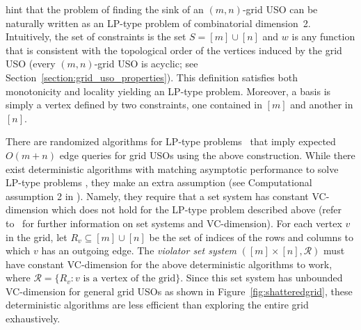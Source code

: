 \documentclass[runningheads,a4paper]{llncs}
\begin{document}
\citet{grid08} hint that the problem of finding the sink of an $(m,n)$-grid USO can be naturally written as an LP-type problem of combinatorial dimension~2. 
Intuitively, the set of constraints is the set $S = [m] \cup [n]$ and $w$ is any function that is consistent with the topological order of the vertices induced by the grid USO (every $(m, n)$-grid USO is acyclic; see Section~\ref{section:grid_uso_properties}). This definition satisfies both monotonicity and locality yielding an LP-type problem.
Moreover, a basis is simply a vertex defined by two constraints, one contained in $[m]$ and another in $[n]$. 

There are randomized algorithms for LP-type problems~\cite{MatousekSW96} that imply expected $O(m+n)$ edge queries for grid USOs using the above construction. 
While there exist deterministic algorithms with matching asymptotic performance to solve LP-type problems \cite{chan16,ChazelleM96}, they make an extra assumption  
(see Computational assumption 2 in \cite{ChazelleM96}). 
Namely, they require that a set system has constant VC-dimension which does not hold for the LP-type problem described above (refer to~\cite{matouvsek2002lectures} for further information on set systems and VC-dimension). 
For each vertex $v$ in the grid, let $R_v\subseteq [m]\cup [n]$ be the set of indices of the rows and columns to which $v$ has an outgoing edge. 
The \emph{violator set system} $([m]\times [n], \mathcal R)$ must have constant VC-dimension for the above deterministic algorithms to work, where $\mathcal R = \{R_v : v\text{ is a vertex of the grid}\}$. 
Since this set system has unbounded VC-dimension for general grid USOs as shown in Figure~\ref{fig:shatteredgrid}, these deterministic algorithms are less efficient than exploring the entire grid exhaustively. 

\end{document}
